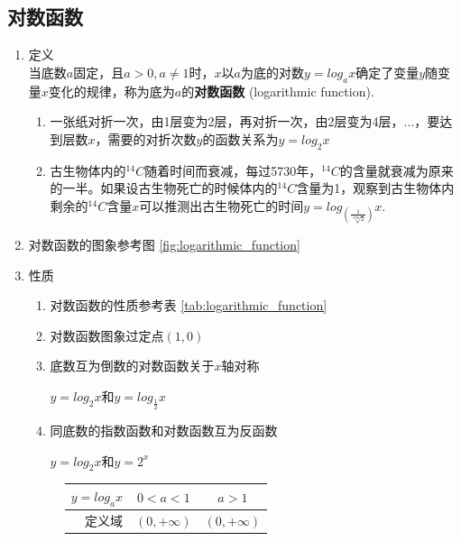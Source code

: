 \subsection*{对数函数}
\begin{enumerate}
    \item 定义 \\
        当底数$a$固定，且$a > 0, a \neq 1$时，$x$以$a$为底的对数$y = log_ax$确定了变量$y$随变量$x$变化的规律，称为底为$a$的\textbf{对数函数} (logarithmic function).
    \begin{example}
        \begin{enumerate}
            \item 一张纸对折一次，由1层变为2层，再对折一次，由2层变为4层，...，要达到层数$x$，需要的对折次数$y$的函数关系为$y=log_2x$
            \item 古生物体内的$^{14}C$随着时间而衰减，每过5730年，$^{14}C$的含量就衰减为原来的一半。如果设古生物死亡的时候体内的$^{14}C$含量为1，观察到古生物体内剩余的$^{14}C$含量$x$可以推测出古生物死亡的时间$y = log_{(\frac{1}{\sqrt[5730]{2}})}x$.
        \end{enumerate}
    \end{example}
    \item 对数函数的图象参考图 \ref{fig:logarithmic_function}
    \item 性质
    \begin{enumerate}
        \item 对数函数的性质参考表 \ref{tab:logarithmic_function}
        \item 对数函数图象过定点$(1, 0)$
        \item 底数互为倒数的对数函数关于$x$轴对称
        \begin{example}
            $y=log_2x$和$y=log_{\frac{1}{2}}x$
        \end{example}
        \item 同底数的指数函数和对数函数互为反函数
        \begin{example}
            $y=log_2x$和$y=2^x$
        \end{example}
    \end{enumerate}
    \begin{figure}[h]
    \centering
    \begin{minipage}[c]{0.45\textwidth}
    \begin{tabular}{r|c|c}
             \hline
             $y=log_ax$ &$0<a<1$ & $a>1$\\
             \hline
             定义域 & $(0, +\infty)$ & $(0, +\infty)$ \\

\end{tabular}
\end{minipage}
\end{figure}
\end{enumerate}
